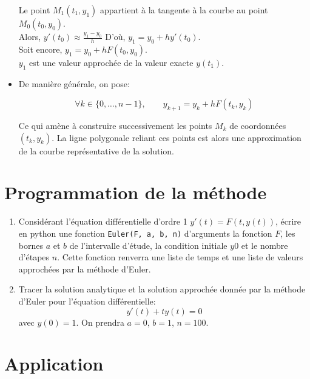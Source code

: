 \begin{itemize}
\begin{minipage}{0.5\linewidth}
		Le point $M_1(t_1,y_1)$ appartient à la tangente à la courbe au point $M_0(t_0,y_0)$.\\
		Alors, $y'(t_0) \approx \displaystyle\frac{y_1-y_0}{h}$
		D'où, $y_1=y_0+hy'(t_0)$.\\
		Soit encore, $y_1=y_0+hF(t_0,y_0)$.\\
		$y_1$ est une valeur approchée de la valeur exacte $y(t_1)$.
		
	\end{minipage}
	
	
	
	\item De manière générale, on pose:
	\begin{framed}\[\forall k\in\{0,\dots,n-1\},\qquad y_{k+1}=y_k+hF(t_k,y_k)\]\end{framed}
	
	Ce qui amène à construire successivement les points $M_k$ de coordonnées $(t_k,y_k)$. La ligne polygonale reliant ces points est alors une approximation de la courbe représentative de la solution.
	
\end{itemize}

\eject \section{Programmation de la méthode }

\begin{enumerate}
	
	\item Considérant l'équation différentielle d'ordre 1 $y'(t)=F(t,y(t))$, écrire en python une fonction \texttt{Euler(F, a, b, n)} d'arguments la fonction $F$, les bornes $a$ et $b$ de l'intervalle d'étude, la condition initiale $y0$ et le nombre d'étapes $n$. Cette fonction renverra une liste de temps et une liste de valeurs approchées par la méthode d'Euler.
	
	\item Tracer la solution analytique et la solution approchée donnée par la méthode d'Euler pour l'équation différentielle:$$y'(t)+ty(t)=0$$ avec $y(0)=1$. On prendra $a=0$, $b=1$, $n=100$.
	
\end{enumerate}

\section{Application}

